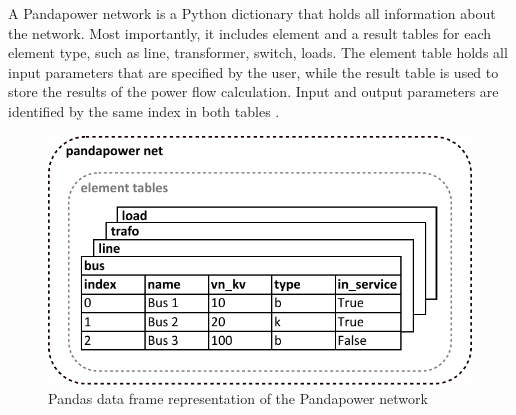 A Pandapower network is a Python dictionary that holds all information about the network. Most importantly, it includes element and a result tables for each element type, such as line, transformer, switch, loads. The element table holds all input parameters that are specified by the user, while the result table is used to store the results of the power flow calculation. Input and output parameters are identified by the same index in both tables \cite{pandapower}.

\begin{figure}[H]
\centering
    \includegraphics[width=.6\linewidth]{images/Background/Pandapower/Pandapower_net.pdf}
\caption{Pandas data frame representation of the Pandapower network}
\end{figure}



